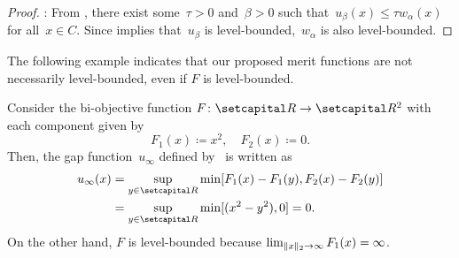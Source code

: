 \documentclass[../main]{subfiles}
\begin{document}
\begin{proof}
    : From , there exist some~$\tau > 0$ and~$\beta > 0$ such that~$u_\beta(x) \le \tau w_\alpha(x)$ for all~$x \in C$.
    Since  implies that~$u_\beta$ is level-bounded,~$w_\alpha$ is also level-bounded.
\end{proof}
The following example indicates that our proposed merit functions are not necessarily level-bounded, even if $F$ is level-bounded.
\begin{example}
    Consider the bi-objective function $F \colon \setR \to \setR^2$ with each component given by
    \begin{equation}
        F_1(x) \coloneqq x^2, \quad F_2(x) \coloneqq 0.
    \end{equation}
    Then, the gap function~$u_\infty$ defined by~ is written as
    \begin{align}
        u_\infty(x) & = \sup_{y \in \setR} \min [ F_1(x) - F_1(y), F_2(x) - F_2(y) ] \\
             & = \sup_{y \in \setR} \min [ (x^2 - y^2), 0 ] = 0.
    \end{align}
    On the other hand, $F$ is level-bounded because $\lim_{\lVert x\rVert_2 \to \infty} F_1(x) = \infty$.
\end{example}
\end{document}
